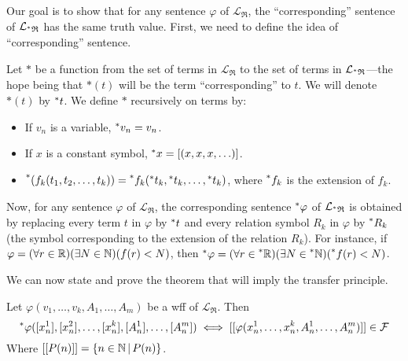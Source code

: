 Our goal is to show that for any sentence $\varphi$ of $\mathcal{L}_\mathfrak{R}$, the ``corresponding'' sentence of $\mathcal{L}_{\prescript{*}{}{\mathfrak{R}}}$ has the same truth value. First, we need to define the idea of ``corresponding'' sentence. 

Let $\ast$ be a function from the set of terms in $\mathcal{L}_\mathfrak{R}$ to the set of terms in $\mathcal{L}_{\prescript{*}{}{\mathfrak R}}$---the hope being that $\ast(t)$ will be the term ``corresponding'' to $t$. We will denote $\ast(t)$ by $\prescript{*}{}{t}$. We define $\ast$ recursively on terms by:
\begin{itemize}
    \item If $v_n$ is a variable, $\prescript{*}{}{v_n} = v_n$.
    \item If $x$ is a constant symbol, $\prescript{*}{}{x} = [(x, x, x, \ldots)]$.
    \item $\prescript{*}{}{(f_k(t_1, t_2, \ldots, t_k))} = \prescript{*}{}{f_k}(\prescript{*}{}{t_k}, \prescript{*}{}{t_k}, \ldots, \prescript{*}{}{t_k})$, where $\prescript{*}{}{f_k}$ is the extension of $f_k$.
\end{itemize}

Now, for any sentence $\varphi$ of $\mathcal{L}_\mathfrak{R}$, the corresponding sentence $\prescript{*}{}{\varphi}$ of $\mathcal{L}_{\prescript{*}{}{\mathfrak R}}$ is obtained by replacing every term $t$ in $\varphi$ by $\prescript{*}{}{t}$ and every relation symbol $R_k$ in $\varphi$ by $\prescript{*}{}{R_k}$ (the symbol corresponding to the extension of the relation $R_k$). For instance, if $\varphi = (\forall r \in \mathbb{R})(\exists N \in \mathbb{N}) (f(r) < N)$, then $\prescript{*}{}{\varphi} = (\forall r \in \prescript{*}{}{\mathbb{R}})(\exists N \in \prescript{*}{}{\mathbb{N}}) (\prescript{*}{}{f}(r) < N)$. 

We can now state and prove the theorem that will imply the transfer principle.

\begin{thm}[\L o\'s's Theorem]\label{LosTheorem}
    Let $\varphi(v_1, \ldots, v_k, A_1, \ldots, A_m)$ be a wff of $\mathcal{L}_\mathfrak{R}$. Then 
    \[\prescript{*}{}{\varphi}([x^1_n], [x^2_n], \ldots, [x^k_n], [A^1_n], \ldots, [A^m_n]) \iff [[\varphi(x^1_n, \ldots, x^k_n, A^1_n, \ldots, A^m_n)]] \in \mathcal{F}\]
    Where $[[P(n)]] = \{n \in \mathbb{N} \,|\, P(n)\}$.
\end{thm}

